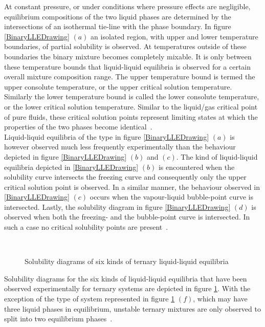 At constant pressure, or under conditions where pressure effects are negligible, equilibrium compositions of the two liquid phases are determined by the intersections of an isothermal tie-line with the phase boundary. In figure \ref{BinaryLLEDrawing} $\left(a\right)$ an isolated region, with upper and lower temperature boundaries, of partial solubility is observed. At temperatures outside of these boundaries the binary mixture becomes completely mixable. It is only between these temperature bounds that liquid-liquid equilibria is observed for a certain overall mixture composition range. The upper temperature bound is termed the upper consolute temperature, or the upper critical solution temperature. Similarly the lower temperature bound is called the lower consolute temperature, or the lower critical solution temperature. Similar to the liquid/gas critical point of pure fluids, these critical solution points represent limiting states at which the properties of the two phases become identical~\cite{LLERetrieval, SmithNessAbbott, GasLiquidProperties, ThermophysicalProperties}.\\

Liquid-liquid equilibria of the type in figure \ref{BinaryLLEDrawing} $\left(a\right)$ is however observed much less frequently experimentally than the behaviour depicted in figure \ref{BinaryLLEDrawing} $\left(b\right)$ and $\left(c\right)$. The kind of liquid-liquid equilibria depicted in \ref{BinaryLLEDrawing} $\left(b\right)$ is encountered when the solubility curve intersects the freezing curve and consequently only the upper critical solution point is observed. In a similar manner, the behaviour observed in \ref{BinaryLLEDrawing} $\left(c\right)$ occurs when the vapour-liquid bubble-point curve is intersected. Lastly, the solubility diagram in figure \ref{BinaryLLEDrawing} $\left(d\right)$  is observed when both the freezing- and the bubble-point curve is intersected. In such a case no critical solubility points are present~\cite{LLERetrieval, SmithNessAbbott, ThermophysicalProperties}.\\

\begin{figure}%
\begin{center}
\resizebox{0.8\textwidth}{!}{}\\
\end{center}
\caption{Solubility diagrams of six kinds of ternary liquid-liquid equilibria} \label{TernaryLLEDrawing}
\end{figure}	

Solubility diagrams for the six kinds of liquid-liquid equilibria that have been observed experimentally for ternary systems are depicted in figure \ref{TernaryLLEDrawing}. With the exception of the type of system represented in figure \ref{TernaryLLEDrawing} $\left(f\right)$, which may have three liquid phases in equilibrium, unstable ternary mixtures are only observed to split into two equilibrium phases~\cite{LLERetrieval, Dechema, LLECalculation, TernaryLLECalculation}.\


